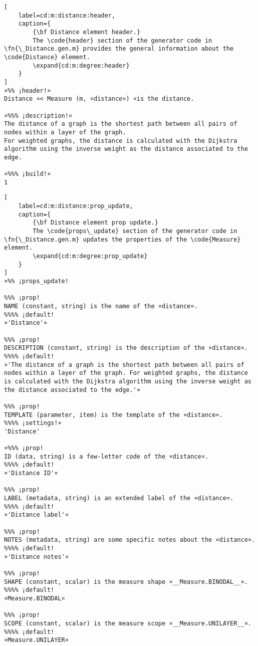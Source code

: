 \documentclass{tufte-handout}
\begin{document}
\begin{lstlisting}[
	label=cd:m:distance:header,
	caption={
		{\bf Distance element header.}
		The \code{header} section of the generator code in \fn{\_Distance.gen.m} provides the general information about the \code{Distance} element.
		\expand{cd:m:degree:header}
	}
]
¤%% ¡header!¤
Distance ¤< Measure (m, ¤distance¤) ¤is the distance.

¤%%% ¡description!¤
The distance of a graph is the shortest path between all pairs of nodes within a layer of the graph.
For weighted graphs, the distance is calculated with the Dijkstra algorithm using the inverse weight as the distance associated to the edge.

¤%%% ¡build!¤
1
\end{lstlisting}

\begin{lstlisting}[
	label=cd:m:distance:prop_update,
	caption={
		{\bf Distance element prop update.}
		The \code{props\_update} section of the generator code in \fn{\_Distance.gen.m} updates the properties of the \code{Measure} element.
		\expand{cd:m:degree:prop_update}
	}
]
¤%% ¡props_update!

%%% ¡prop!
NAME (constant, string) is the name of the ¤distance¤.
%%%% ¡default!
¤'Distance'¤

%%% ¡prop!
DESCRIPTION (constant, string) is the description of the ¤distance¤.
%%%% ¡default!
¤'The distance of a graph is the shortest path between all pairs of nodes within a layer of the graph. For weighted graphs, the distance is calculated with the Dijkstra algorithm using the inverse weight as the distance associated to the edge.'¤

%%% ¡prop!
TEMPLATE (parameter, item) is the template of the ¤distance¤.
%%%% ¡settings!¤
'Distance'

¤%%% ¡prop!
ID (data, string) is a few-letter code of the ¤distance¤.
%%%% ¡default!
¤'Distance ID'¤

%%% ¡prop!
LABEL (metadata, string) is an extended label of the ¤distance¤.
%%%% ¡default!
¤'Distance label'¤

%%% ¡prop!
NOTES (metadata, string) are some specific notes about the ¤distance¤.
%%%% ¡default!
¤'Distance notes'¤

%%% ¡prop!
SHAPE (constant, scalar) is the measure shape ¤__Measure.BINODAL__¤.
%%%% ¡default!
¤Measure.BINODAL¤

%%% ¡prop!
SCOPE (constant, scalar) is the measure scope ¤__Measure.UNILAYER__¤.
%%%% ¡default!
¤Measure.UNILAYER¤


\end{lstlisting}
\end{document}
